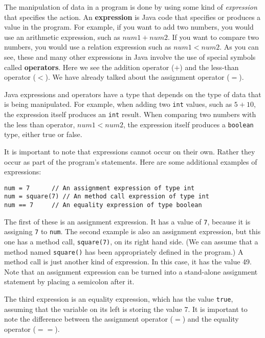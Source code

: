 \noindent The manipulation of data in a program is done by using some
kind of {\em expression} that specifies the action.  An {\bf
expression} is Java code that specifies or produces a value in the
program.  For example, if you want to add two numbers, you would use
an arithmetic expression, such as $num1 + num2$. If you want to
compare two numbers, you would use a relation expression such as $num1
< num2$. As you can see, these and many other expressions in Java
involve the use of special symbols called {\bf operators}. Here we see
the addition operator ($+$) and the less-than operator ($<$). We have
already talked about the assignment operator ($=$).

Java expressions and operators have a type that depends on the type of
data that is being manipulated. For example, when adding two {\tt int}
values, such as $5 + 10$, the expression itself produces an {\tt int}
result.  When comparing two numbers with the less than operator, $num1
< num2$, the expression itself produces a {\tt boolean} type, either
true or false. 

It is important to note that expressions cannot occur on their own.
Rather they occur as part of the program's statements.  Here are some
additional examples of expressions:

\begin{jjjlisting}
\begin{lstlisting}
num = 7      // An assignment expression of type int
num = square(7) // An method call expression of type int
num == 7     // An equality expression of type boolean
\end{lstlisting}
\end{jjjlisting}

\noindent  The first of these is an assignment expression. It has a value 
of {\tt 7}, because it is assigning {\tt 7} to {\tt num}. The second
example is also an assignment expression, but this one has a method
call, {\tt square(7)}, on its right hand side. (We can assume that a
method named {\tt square()} has been appropriately defined in the
program.)  A method call is just another kind of expression. In this
case, it has the value 49.  Note that an assignment expression can be
turned into a stand-alone assignment statement by placing a semicolon
after it.

The third expression is an equality expression, which has the value
{\tt true}, assuming that the variable on its left is storing the
value 7. It is important to note the difference between the assignment
operator ($=$) and the equality operator ($==$).

